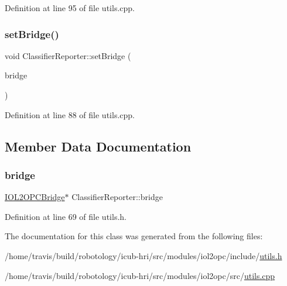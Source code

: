 Definition at line 95 of file utils.\+cpp.

\mbox{\label{classClassifierReporter_a06fe36031a27e4bfae35ba038f67eb9d}} 
\subsubsection{\texorpdfstring{set\+Bridge()}{setBridge()}}
{\footnotesize\ttfamily void Classifier\+Reporter\+::set\+Bridge (\begin{DoxyParamCaption}\item[{\hyperlink{group__iol2opc_classIOL2OPCBridge}{I\+O\+L2\+O\+P\+C\+Bridge} $\ast$}]{bridge }\end{DoxyParamCaption})}



Definition at line 88 of file utils.\+cpp.



\subsection{Member Data Documentation}
\mbox{\label{classClassifierReporter_a84b4769137f381ba4c0c21ae4b26bf14}} 
\subsubsection{\texorpdfstring{bridge}{bridge}}
{\footnotesize\ttfamily \hyperlink{group__iol2opc_classIOL2OPCBridge}{I\+O\+L2\+O\+P\+C\+Bridge}$\ast$ Classifier\+Reporter\+::bridge\hspace{0.3cm}{\ttfamily [protected]}}



Definition at line 69 of file utils.\+h.



The documentation for this class was generated from the following files\+:\begin{DoxyCompactItemize}
\item 
/home/travis/build/robotology/icub-\/hri/src/modules/iol2opc/include/\hyperlink{utils_8h}{utils.\+h}\item 
/home/travis/build/robotology/icub-\/hri/src/modules/iol2opc/src/\hyperlink{utils_8cpp}{utils.\+cpp}\end{DoxyCompactItemize}
